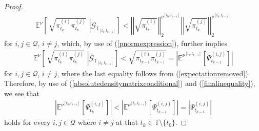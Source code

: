 \documentclass[10pt,a4paper]{amsart}
\def\G{\mathscr{G}}
\def\T{\mathbb{T}}
\begin{document}
\begin{proof}
\begin{align}
\mathbb{E}^{\nu}\left[ \,  \sqrt{\pi_{t_{k}}^{(i)}\pi_{t_{k}}^{(j)}} \,\, \left| \G_{\T_{[t_0,t_{k-1}]}} \right.\right] < \left|\left| \sqrt{\pi^{(i)}_{t_{k}} }\right|\right|^{\nu^{[t_{0},t_{k-1}]}}_2 \left|\left| \sqrt{\pi^{(j)}_{t_{k}} }\right|\right|^{\nu^{[t_{0},t_{k-1}]}}_2 
\end{align}
for $i,j\in\mathcal{Q}$, $i\neq j$, which, by use of (\ref{pnormexpression}), further implies
 \begin{align}
\mathbb{E}^{\nu}\left[ \,  \sqrt{\pi_{t_{k}}^{(i)}\pi_{t_{k}}^{(j)}} \,\, \left| \G_{\T_{[t_0,t_{k-1}]}} \right.\right] < \sqrt{\pi^{(i)}_{t_{k-1}} \pi^{(j)}_{t_{k-1}}} 
= \left|\mathbb{E}^{\nu^{[t_{0},t_{k-1}]}}\left[\Psi_{t_{k-1}}^{(i,j)}\right] \right| \label{finalinequality}
\end{align}
%
for $i,j\in\mathcal{Q}$, $i\neq j$, where the last equality follows from (\ref{expectationremoved}). Therefore, by use of (\ref{absolutedensitymatrixconditional}) and (\ref{finalinequality}), we see that
%
\begin{align}
\left|\mathbb{E}^{\nu^{[t_{0},t_{k-1}]}}\left[\Psi_{t_{k}}^{(i,j)}\right] \right| < \left|\mathbb{E}^{\nu^{[t_{0},t_{k-1}]}}\left[\Psi_{t_{k-1}}^{(i,j)}\right] \right| = \left| \Psi_{t_{k-1}}^{(i,j)} \right| 
\end{align}
%
holds for every $i,j\in\mathcal{Q}$ where $i\neq j$ at that $t_k\in\T\setminus\{t_0\}$.
\end{proof}
\end{document}
